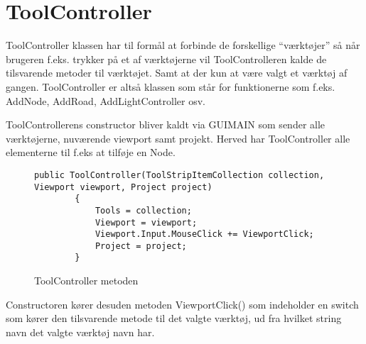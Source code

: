 \chapter{ToolController}\label{ToolController}

ToolController klassen har til formål at forbinde de forskellige “værktøjer” så når brugeren f.eks. trykker på et af værktøjerne vil ToolControlleren kalde de tilsvarende metoder til værktøjet. Samt at der kun at være valgt et værktøj af gangen. ToolController er altså klassen som står for funktionerne som f.eks. AddNode, AddRoad, AddLightController osv.

\vspace{5mm}

ToolControllerens constructor bliver kaldt via GUIMAIN som sender alle værktøjerne, nuværende viewport samt projekt. Herved har ToolController alle elementerne til f.eks at tilføje en Node.

\begin{figure}[H]
\begin{lstlisting}
public ToolController(ToolStripItemCollection collection, Viewport viewport, Project project)
        {
            Tools = collection;
            Viewport = viewport;
            Viewport.Input.MouseClick += ViewportClick;
            Project = project;
        }
\end{lstlisting}
\caption{ToolController metoden}\label{ToolControllerCode}
\end{figure}

\vspace{5mm}

Constructoren kører desuden metoden ViewportClick() som indeholder en switch som kører den tilsvarende metode til det valgte værktøj, ud fra hvilket string navn det valgte værktøj navn har.

